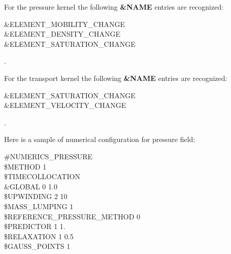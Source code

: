 \begin{description}
    For the pressure kernel the following  \textbf{\&NAME} entries are recognized:
    {
      \begin{description}
       \item [\&ELEMENT\_MOBILITY\_CHANGE]
       \item [\&ELEMENT\_DENSITY\_CHANGE]
       \item [\&ELEMENT\_SATURATION\_CHANGE]
      \end{description}.
    }

    For the transport kernel the following  \textbf{\&NAME} entries are recognized:
    {
      \begin{description}
       \item [\&ELEMENT\_SATURATION\_CHANGE]
       \item [\&ELEMENT\_VELOCITY\_CHANGE]
      \end{description}.
    }


\end{description}


Here is a sample of numerical configuration for pressure field:

\begin{center}
\shadowbox
 {
   \parbox[c]{6cm}
   {
    \#NUMERICS\_PRESSURE\\
    \$METHOD 1\\
    \$TIMECOLLOCATION\\
      \&GLOBAL 0 1.0\\
    \$UPWINDING 2 10\\
    \$MASS\_LUMPING 1\\
    \$REFERENCE\_PRESSURE\_METHOD 0\\
    \$PREDICTOR 1 1.\\
    \$RELAXATION 1 0.5\\
    \$GAUSS\_POINTS 1\\
   }
  }
\end{center}
